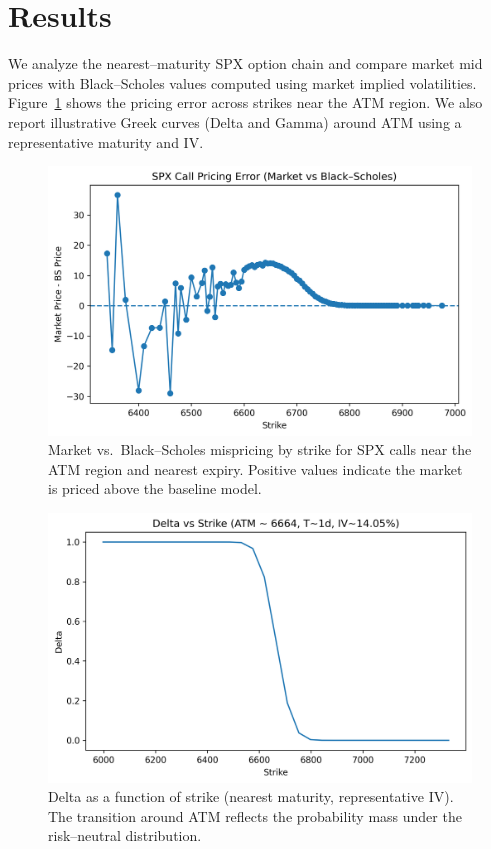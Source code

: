 \documentclass[12pt]{article}
\begin{document}
\section{Results}
We analyze the nearest--maturity SPX option chain and compare market mid prices with Black--Scholes values computed using market
implied volatilities. Figure~\ref{fig:pricing-error} shows the pricing error across strikes near the ATM region.
We also report illustrative Greek curves (Delta and Gamma) around ATM using a representative maturity and IV.

\begin{figure}[H]
\centering
\includegraphics[width=0.85\linewidth]{pricing_error_vs_strike.png}
\caption{Market vs.\ Black--Scholes mispricing by strike for SPX calls near the ATM region and nearest expiry.
Positive values indicate the market is priced above the baseline model.}
\label{fig:pricing-error}
\end{figure}

\begin{figure}[H]
\centering
\includegraphics[width=0.85\linewidth]{delta_vs_strike.png}
\caption{Delta as a function of strike (nearest maturity, representative IV). The transition around ATM reflects
the probability mass under the risk--neutral distribution.}
\label{fig:delta}
\end{figure}
\end{document}
